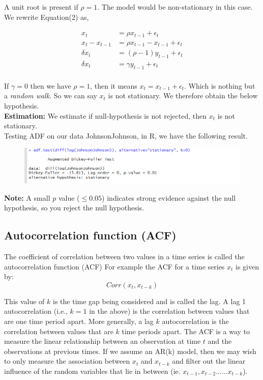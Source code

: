\documentclass[a4paper]{article}
\theoremstyle{definition}
\begin{document}
A unit root is present if $ \rho=1 $. The model would be non-stationary in this case. We rewrite Equation(2) as, 

\begin{align*}
x_t &= \rho x_{t-1} +\epsilon_t \\
x_t - x_{t-1} &= \rho x_{t-1} -x_{t-1} +\epsilon_t \\
\delta x_t &= (\rho-1) y_{t-1} +\epsilon_t\\
\delta x_t &= \gamma y_{t-1} +\epsilon_t\\
\end{align*}

If $ \gamma = 0 $ then we have $ \rho=1 $, then it means $ x_t = x_{t-1} +\epsilon_t $. Which is nothing but a \textit{random walk}. So we can say $ x_t $ is not stationary. We therefore obtain the below hypothesis. \\

\textbf{Estimation:} We estimate if null-hypothesis is not rejected, then $ x_t $ is not stationary. \\

Testing ADF on our data JohnsonJohnson, in R, we have the following result. 

\begin{figure}
[h]
\includegraphics[width=1\linewidth]{ADFtest}
\end{figure}

\textbf{Note:} A small $ p $ value ($ \leq 0.05 $) indicates strong evidence against the null hypothesis, so you reject the null hypothesis. 

\subsection{Autocorrelation function (ACF)}
The coefficient of correlation between two values in a time series is called the autocorrelation function (ACF) For example the ACF for a time series $ x_t $ is given by:
\begin{equation*}
Corr(x_t,x_{t-k}) 
\end{equation*}

This value of $ k $ is the time gap being considered and is called the lag. A lag 1 autocorrelation (i.e., $ k = 1 $ in the above) is the correlation between values that are one time period apart. More generally, a lag $ k $ autocorrelation is the correlation between values that are $ k $ time periods apart.  The ACF is a way to measure the linear relationship between an observation at time $ t $ and the observations at previous times. If we assume an AR(k) model, then we may wish to only measure the association between $ x_t $ and $ x_{t-k} $ and filter out the linear influence of the random variables that lie in between (ie. $ x_{t-1},x_{t-2}......x_{t-k}  $). 
\end{document}
